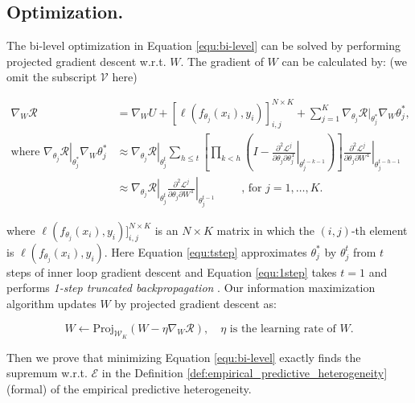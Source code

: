 
\subsection{Optimization.}
The bi-level optimization in Equation \ref{equ:bi-level} can be solved by performing projected gradient descent w.r.t. $W$.
The gradient of $W$ can be calculated by: (we omit the subscript $\mathcal{V}$ here)
\begin{small}
\begin{align}
	\nabla_W\mathcal R &=\nabla_W U + \left[\ell(f_{\theta_j}(x_i),y_i)\right]_{i,j}^{N\times K} + \sum_{j=1}^K \boxed{\nabla_{\theta_j}\mathcal{R}|_{\theta^*_j}\nabla_W\theta_j^*},\\
	\label{equ:tstep}
	\text{where }\boxed{\left.\nabla_{\theta_j}\mathcal{R}\right\vert_{\theta^*_j}\nabla_W\theta_j^*} & \approx \left.\nabla_{\theta_j}\mathcal{R}\right\vert_{\theta_j^t}\sum_{h\leq t}\left [ \prod_{k<h}(I - \left.\frac{\partial^2\mathcal{L}^j}{\partial\theta_j \partial \theta_j^{\mathrm{T}}}\right\vert_{\theta_j^{t-k-1}})\right ]\left.\frac{\partial^2\mathcal{L}^j}{\partial\theta_j\partial W^{\mathrm{T}}}\right\vert_{\theta_j^{t-h-1}} \\
	\label{equ:1step}
	&\approx  \left.\nabla_{\theta_j}\mathcal{R}\right\vert_{\theta_j^t}\left.\frac{\partial^2\mathcal{L}^j}{\partial \theta_j\partial W^{\mathrm{T}}}\right \vert_{\theta_j^{t-1}}\quad\quad\text{  , for }j=1,\dots,K.
\end{align}
\end{small}
where $\ell(f_{\theta_j}(x_i),y_i)]_{i,j}^{N\times K}$ is an $N\times K$ matrix in which the $(i,j)$-th element is $\ell(f_{\theta_j}(x_i),y_i)$.
Here Equation \ref{equ:tstep} approximates $\theta_j^*$ by $\theta_j^t$ from $t$ steps of inner loop gradient descent and Equation \ref{equ:1step} takes $t=1$ and performs \emph{1-step truncated backpropagation} \citep{shaban2019truncated,zhou2022model}.
Our information maximization algorithm updates $W$ by projected gradient descent as:
\begin{small}
\begin{equation}
	W \leftarrow \text{Proj}_{\mathcal{W}_K}\left(W-\eta\nabla_W\mathcal R\right),\quad \eta\text{ is the learning rate of }W.
\end{equation}	
\end{small}

Then we prove that minimizing Equation \ref{equ:bi-level} exactly finds the supremum w.r.t. $\mathcal{E}$ in the Definition \ref{def:empirical_predictive_heterogeneity} (formal) of the empirical predictive heterogeneity.

